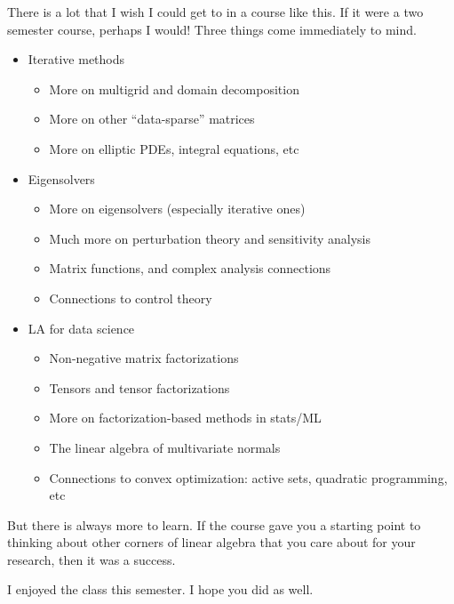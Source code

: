 \documentclass[12pt, leqno]{article} %
\begin{document}
There is a lot that I wish I could get to in a course like this.
If it were a two semester course, perhaps I would!  Three things
come immediately to mind.

\begin{itemize}
\item Iterative methods
  \begin{itemize}
  \item More on multigrid and domain decomposition
  \item More on other ``data-sparse'' matrices
  \item More on elliptic PDEs, integral equations, etc
  \end{itemize}
\item Eigensolvers
  \begin{itemize}
  \item More on eigensolvers (especially iterative ones)
  \item Much more on perturbation theory and sensitivity analysis
  \item Matrix functions, and complex analysis connections
  \item Connections to control theory
  \end{itemize}
\item LA for data science
  \begin{itemize}
  \item Non-negative matrix factorizations
  \item Tensors and tensor factorizations
  \item More on factorization-based methods in stats/ML
  \item The linear algebra of multivariate normals
  \item Connections to convex optimization: active sets, quadratic programming, etc
  \end{itemize}
\end{itemize}

But there is always more to learn.  If the course gave you a starting
point to thinking about other corners of linear algebra that you care
about for your research, then it was a success.

I enjoyed the class this semester.  I hope you did as well.
\end{document}
